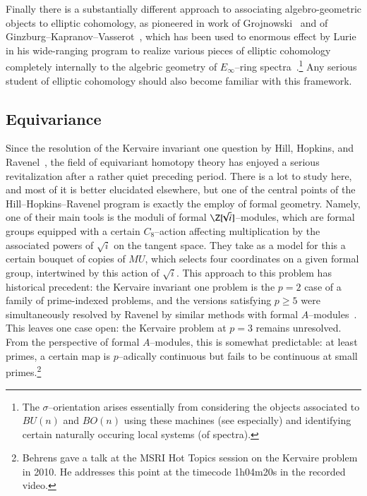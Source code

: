 Finally there is a substantially different approach to associating algebro-geometric objects to elliptic cohomology, as pioneered in work of Grojnowski~\cite{Grojnowski} and of Ginzburg--Kapranov--Vasserot~\cite{GKV}, which has been used to enormous effect by Lurie in his wide-ranging program to realize various pieces of elliptic cohomology completely internally to the algebric geometry of $E_\infty$--ring spectra~\cite{LurieSurveyOfEll}.\footnote{The $\sigma$--orientation arises essentially from considering the objects associated to $BU(n)$ and $BO(n)$ using these machines (see \cite[Section 5.1]{LurieSurveyOfEll} especially) and identifying certain naturally occuring local systems (of spectra).}  Any serious student of elliptic cohomology should also become familiar with this framework.







\subsection*{Equivariance}

Since the resolution of the Kervaire invariant one question by Hill, Hopkins, and Ravenel~\cite{HHR}, the field of equivariant homotopy theory has enjoyed a serious revitalization after a rather quiet preceding period.  There is a lot to study here, and most of it is better elucidated elsewhere, but one of the central points of the Hill--Hopkins--Ravenel program is exactly the employ of formal geometry.  Namely, one of their main tools is the moduli of formal $\Z[\!\!\sqrt{i}]$--modules, which are formal groups equipped with a certain $C_8$--action affecting multiplication by the associated powers of $\!\!\sqrt{i}$ on the tangent space.  They take as a model for this a certain bouquet of copies of $MU$, which selects four coordinates on a given formal group, intertwined by this action of $\!\!\sqrt{i}$.  This approach to this problem has historical precedent: the Kervaire invariant one problem is the $p = 2$ case of a family of prime-indexed problems, and the versions satisfying $p \ge 5$ were simultaneously resolved by Ravenel by similar methods with formal $A$--modules~\cite{RavenelNonexistenceArfInvariantElts}.  This leaves one case open: the Kervaire problem at $p = 3$ remains unresolved.  From the perspective of formal $A$--modules, this is somewhat predictable: at least primes, a certain map is $p$--adically continuous but fails to be continuous at small primes.\footnote{Behrens gave a talk at the MSRI Hot Topics session on the Kervaire problem in 2010.  He addresses this point at the timecode 1h04m20s in the recorded video.}

